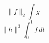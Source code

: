 \documentclass{article}
\begin{document}
\[ \|f\|_2\int g \]
\[ \|h\|^3\int_0^1 f\,dt \]
\end{document}
